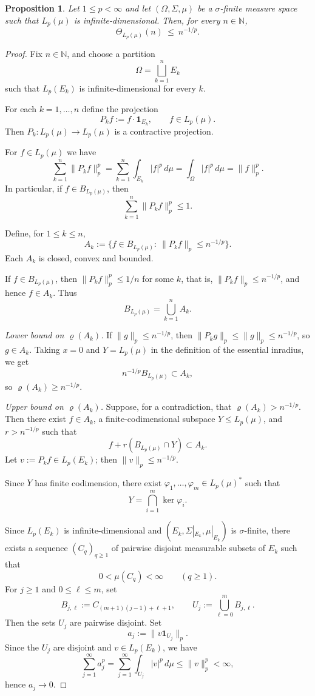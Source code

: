 \documentclass[reqno,11pt]{amsart}
\theoremstyle{plain}
\newtheorem{proposition}[theorem]{Proposition}
\theoremstyle{definition}
\theoremstyle{remark}
\renewcommand{\le}{\leqslant}
\renewcommand{\ge}{\geqslant}
\begin{document}
\begin{proposition}\label{prop:Lp-mu-upper}
Let $1\le p<\infty$ and let $(\Omega,\Sigma,\mu)$ be a $\sigma$-finite
measure space such that $L_p(\mu)$ is infinite-dimensional. Then, for every
$n\in\mathbb{N}$,
\[
\Theta_{L_p(\mu)}(n)\ \le\ n^{-1/p}.
\]
\end{proposition}

\begin{proof}
Fix $n\in\mathbb N$, and choose a partition
\[
\Omega=\bigsqcup_{k=1}^n E_k
\]
such that $L_p(E_k)$ is infinite-dimensional for every $k$.

For each $k=1,\dots,n$ define the projection
\[
P_k f := f\cdot\mathbf{1}_{E_k}, \qquad f\in L_p(\mu).
\]
Then $P_k:L_p(\mu)\to L_p(\mu)$ is a contractive projection.

For $f\in L_p(\mu)$ we have
\[
\sum_{k=1}^n \|P_k f\|_p^p
= \sum_{k=1}^n \int_{E_k} |f|^p\, d\mu
= \int_{\Omega} |f|^p\, d\mu
= \|f\|_p^p.
\]
In particular, if $f\in B_{L_p(\mu)}$, then
\[
\sum_{k=1}^n \|P_k f\|_p^p \le 1.
\]

Define, for $1\le k\le n$,
\[
A_k := \bigl\{ f\in B_{L_p(\mu)}:\ \|P_k f\|_p\le n^{-1/p} \bigr\}.
\]
Each $A_k$ is closed, convex and bounded.

If $f\in B_{L_p(\mu)}$, then $\|P_k f\|_p^p \le 1/n$ for some $k$, that
is, $\|P_k f\|_p\le n^{-1/p}$, and hence $f\in A_k$. Thus
\[
B_{L_p(\mu)} = \bigcup_{k=1}^n A_k.
\]

\smallskip
\noindent\emph{Lower bound on $\varrho(A_k)$.}
If $\|g\|_p\le n^{-1/p}$, then $\|P_k g\|_p\le \|g\|_p\le n^{-1/p}$, so
$g\in A_k$. Taking $x=0$ and $Y=L_p(\mu)$ in the definition of the
essential inradius, we get
\[
n^{-1/p} B_{L_p(\mu)} \subset A_k,
\]
so $\varrho(A_k)\ge n^{-1/p}$.

\smallskip
\noindent\emph{Upper bound on $\varrho(A_k)$.}
Suppose, for a contradiction, that $\varrho(A_k)>n^{-1/p}$. Then there exist
$f\in A_k$, a finite-codimensional subspace $Y\le L_p(\mu)$, and
$r>n^{-1/p}$ such that
\[
f + r(B_{L_p(\mu)}\cap Y)\subset A_k.
\]
Let $v := P_k f\in L_p(E_k)$; then $\|v\|_p\le n^{-1/p}$.

Since $Y$ has finite codimension, there exist $\varphi_1,\dots,\varphi_m\in
L_p(\mu)^*$ such that
\[
Y = \bigcap_{i=1}^m \ker\varphi_i.
\]

Since $L_p(E_k)$ is infinite-dimensional and $(E_k,\Sigma|_{E_k},\mu|_{E_k})$
is $\sigma$-finite, there exists a sequence $(C_q)_{q\ge1}$ of pairwise
disjoint measurable subsets of $E_k$ such that
\[
0<\mu(C_q)<\infty\qquad(q\ge1).
\]
For $j\ge1$ and $0\le \ell\le m$, set
\[
B_{j,\ell}:=C_{(m+1)(j-1)+\ell+1},
\qquad
U_j:=\bigcup_{\ell=0}^m B_{j,\ell}.
\]
Then the sets $U_j$ are pairwise disjoint. Set
\[
a_j := \|v\mathbf 1_{U_j}\|_p.
\]
Since the $U_j$ are disjoint and $v\in L_p(E_k)$, we have
\[
\sum_{j=1}^\infty a_j^p
=
\sum_{j=1}^\infty \int_{U_j}|v|^p\,d\mu
\le \|v\|_p^p<\infty,
\]
hence $a_j\to0$.


\end{proof}
\end{document}
